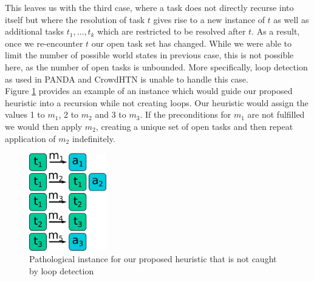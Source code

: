 This leaves us with the third case, where a task does not directly recurse into itself but where the resolution of task $t$ gives rise to a new instance of $t$ as well as additional tasks $t_1, \ldots, t_k$ which are restricted to be resolved after $t$. As a result, once we re-encounter $t$ our open task set has changed. While we were able to limit the number of possible world states in previous case, this is not possible here, as the number of open tasks is unbounded. More specifically, loop detection as used in PANDA and CrowdHTN is unable to handle this case. \\
Figure \ref{figure: pathological heuristic loop} provides an example of an instance which would guide our proposed heuristic into a recursion while not creating loops. Our heuristic would assign the values 1 to $m_1$, 2 to $m_2$ and 3 to $m_3$. If the preconditions for $m_1$ are not fulfilled we would then apply $m_2$, creating a unique set of open tasks and then repeat application of $m_2$ indefinitely.
\begin{figure}[h!]
	\caption{Pathological instance for our proposed heuristic that is not caught by loop detection}
	\label{figure: pathological heuristic loop}
	\centering
	\includegraphics[width=0.3\textwidth]{images/final/heuristic_pathological_loop}
\end{figure}

